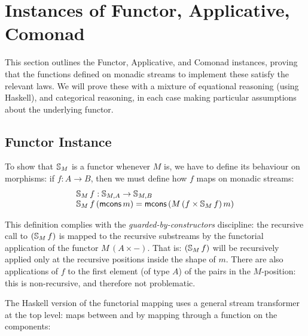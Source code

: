 \section{Instances of Functor, Applicative, Comonad}\label{sec:type_classes}

This section outlines the Functor, Applicative, and Comonad instances, proving that the functions defined on monadic streams to implement these satisfy the relevant laws. We will prove these with a mixture of equational reasoning (using Haskell), and categorical reasoning, in each case making particular assumptions about the underlying functor.

\subsection{Functor Instance}

To show that $\mathbb{S}_{M}$ is a functor whenever $M$ is, we have to define its behaviour on morphisms: if $f:A\rightarrow B$, then we must define how $f$ maps on monadic streams:
$$
\begin{array}{l}
\mathbb{S}_{M}\,f : \mathbb{S}_{M,A} \rightarrow \mathbb{S}_{M,B}\\
\mathbb{S}_{M}\,f\,(\mathsf{mcons}\,m) = \mathsf{mcons}\,(M\,(f\times \mathbb{S}_{M}\,f)\,m)
\end{array}
$$

This definition complies with the {\em guarded-by-constructors} discipline: the recursive call to $(\mathbb{S}_{M}\,f)$ is mapped to the recursive substreams by the functorial application of the functor $M\,(A \times -)$.
That is: $(\mathbb{S}_{M}\,f)$ will be recursively applied only at the recursive positions inside the shape of $m$.
There are also applications of $f$ to the first element (of type $A$) of the pairs in the $M$-position: this is non-recursive, and therefore not problematic.

The Haskell version of the functorial mapping uses a general stream transformer at the top level:  maps between  and  by mapping through  a function on the components:


